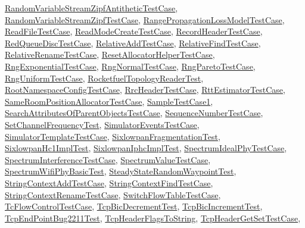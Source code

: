 \hyperlink{classRandomVariableStreamZipfAntitheticTestCase}{Random\+Variable\+Stream\+Zipf\+Antithetic\+Test\+Case}, \hyperlink{classRandomVariableStreamZipfTestCase}{Random\+Variable\+Stream\+Zipf\+Test\+Case}, \hyperlink{classRangePropagationLossModelTestCase}{Range\+Propagation\+Loss\+Model\+Test\+Case}, \hyperlink{classReadFileTestCase}{Read\+File\+Test\+Case}, \hyperlink{classReadModeCreateTestCase}{Read\+Mode\+Create\+Test\+Case}, \hyperlink{classRecordHeaderTestCase}{Record\+Header\+Test\+Case}, \hyperlink{classRedQueueDiscTestCase}{Red\+Queue\+Disc\+Test\+Case}, \hyperlink{classRelativeAddTestCase}{Relative\+Add\+Test\+Case}, \hyperlink{classRelativeFindTestCase}{Relative\+Find\+Test\+Case}, \hyperlink{classRelativeRenameTestCase}{Relative\+Rename\+Test\+Case}, \hyperlink{classResetAllocatorHelperTestCase}{Reset\+Allocator\+Helper\+Test\+Case}, \hyperlink{classRngExponentialTestCase}{Rng\+Exponential\+Test\+Case}, \hyperlink{classRngNormalTestCase}{Rng\+Normal\+Test\+Case}, \hyperlink{classRngParetoTestCase}{Rng\+Pareto\+Test\+Case}, \hyperlink{classRngUniformTestCase}{Rng\+Uniform\+Test\+Case}, \hyperlink{classRocketfuelTopologyReaderTest}{Rocketfuel\+Topology\+Reader\+Test}, \hyperlink{classRootNamespaceConfigTestCase}{Root\+Namespace\+Config\+Test\+Case}, \hyperlink{classRrcHeaderTestCase}{Rrc\+Header\+Test\+Case}, \hyperlink{classRttEstimatorTestCase}{Rtt\+Estimator\+Test\+Case}, \hyperlink{classSameRoomPositionAllocatorTestCase}{Same\+Room\+Position\+Allocator\+Test\+Case}, \hyperlink{classSampleTestCase1}{Sample\+Test\+Case1}, \hyperlink{classSearchAttributesOfParentObjectsTestCase}{Search\+Attributes\+Of\+Parent\+Objects\+Test\+Case}, \hyperlink{classSequenceNumberTestCase}{Sequence\+Number\+Test\+Case}, \hyperlink{classSetChannelFrequencyTest}{Set\+Channel\+Frequency\+Test}, \hyperlink{classSimulatorEventsTestCase}{Simulator\+Events\+Test\+Case}, \hyperlink{classSimulatorTemplateTestCase}{Simulator\+Template\+Test\+Case}, \hyperlink{classSixlowpanFragmentationTest}{Sixlowpan\+Fragmentation\+Test}, \hyperlink{classSixlowpanHc1ImplTest}{Sixlowpan\+Hc1\+Impl\+Test}, \hyperlink{classSixlowpanIphcImplTest}{Sixlowpan\+Iphc\+Impl\+Test}, \hyperlink{classSpectrumIdealPhyTestCase}{Spectrum\+Ideal\+Phy\+Test\+Case}, \hyperlink{classSpectrumInterferenceTestCase}{Spectrum\+Interference\+Test\+Case}, \hyperlink{classSpectrumValueTestCase}{Spectrum\+Value\+Test\+Case}, \hyperlink{classSpectrumWifiPhyBasicTest}{Spectrum\+Wifi\+Phy\+Basic\+Test}, \hyperlink{classSteadyStateRandomWaypointTest}{Steady\+State\+Random\+Waypoint\+Test}, \hyperlink{classStringContextAddTestCase}{String\+Context\+Add\+Test\+Case}, \hyperlink{classStringContextFindTestCase}{String\+Context\+Find\+Test\+Case}, \hyperlink{classStringContextRenameTestCase}{String\+Context\+Rename\+Test\+Case}, \hyperlink{classSwitchFlowTableTestCase}{Switch\+Flow\+Table\+Test\+Case}, \hyperlink{classTcFlowControlTestCase}{Tc\+Flow\+Control\+Test\+Case}, \hyperlink{classTcpBicDecrementTest}{Tcp\+Bic\+Decrement\+Test}, \hyperlink{classTcpBicIncrementTest}{Tcp\+Bic\+Increment\+Test}, \hyperlink{classTcpEndPointBug2211Test}{Tcp\+End\+Point\+Bug2211\+Test}, \hyperlink{classTcpHeaderFlagsToString}{Tcp\+Header\+Flags\+To\+String}, \hyperlink{classTcpHeaderGetSetTestCase}{Tcp\+Header\+Get\+Set\+Test\+Case}, 